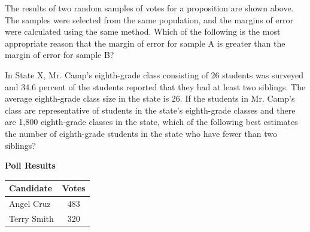 \vspace{1em}

The results of two random samples of votes for a proposition are shown above.  
The samples were selected from the same population, and the margins of error were calculated using the same method.  
Which of the following is the most appropriate reason that the margin of error for sample A is greater than the margin of error for sample B?

\vspace{0.75em}


\vspace{2em}

\newpage
\noindent\markforreview
\vspace{1em}

In State X, Mr. Camp’s eighth-grade class consisting of 26 students was surveyed and 34.6 percent of the students reported that they had at least two siblings.  
The average eighth-grade class size in the state is 26.  
If the students in Mr. Camp’s class are representative of students in the state’s eighth-grade classes and there are 1,800 eighth-grade classes in the state,  
which of the following best estimates the number of eighth-grade students in the state who have fewer than two siblings?

\vspace{0.75em}


\vspace{2em}


\noindent\markforreview
\begin{center}
    

\textbf{Poll Results}

\vspace{0.4em}
\begin{tabular}{|l|c|}
\hline
Candidate & Votes \\
\hline
Angel Cruz & 483 \\
Terry Smith & 320 \\
\hline
\end{tabular}
\end{center}

